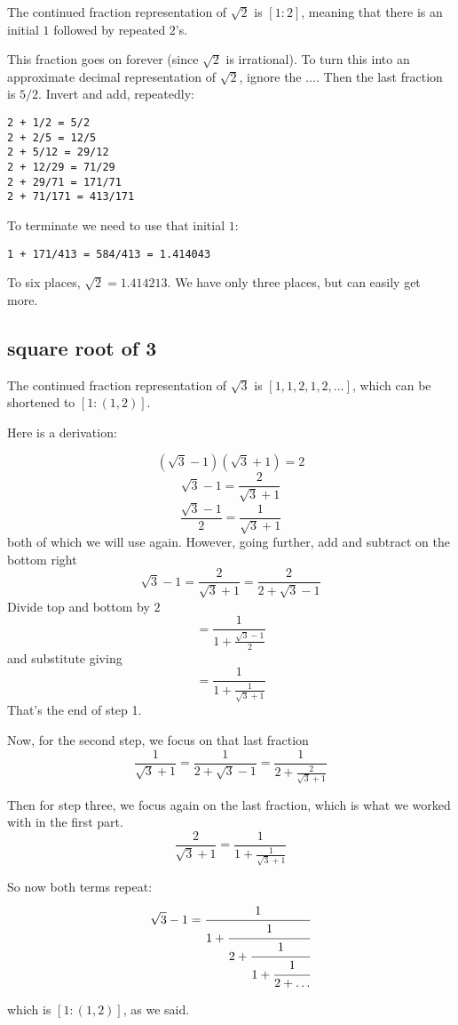 \documentclass[11pt, oneside]{article}
\begin{document}
The continued fraction representation of $\sqrt{2}$ is $[1:2]$, meaning that there is an initial $1$ followed by repeated $2$'s.

This fraction goes on forever (since $\sqrt{2}$ is irrational).  To turn this into an approximate decimal representation of $\sqrt{2}$, ignore the $\dots$.  Then the last fraction is $5/2$.  Invert and add, repeatedly:

\begin{verbatim}
2 + 1/2 = 5/2
2 + 2/5 = 12/5
2 + 5/12 = 29/12
2 + 12/29 = 71/29
2 + 29/71 = 171/71
2 + 71/171 = 413/171
\end{verbatim}

To terminate we need to use that initial $1$:
\begin{verbatim}
1 + 171/413 = 584/413 = 1.414043
\end{verbatim}

To six places, $\sqrt{2} = 1.414213$.  We have only three places, but can easily get more.

\subsection*{square root of 3}
The continued fraction representation of $\sqrt{3}$ is $[1,1,2,1,2, \dots]$, which can be shortened to $[1:(1,2)]$.  

Here is a derivation:

\[ (\sqrt{3} - 1)(\sqrt{3} + 1) = 2 \]
\[ \sqrt{3} - 1 = \frac{2}{\sqrt{3} + 1}   \]
\[ \frac{\sqrt{3} - 1}{2} = \frac{1}{\sqrt{3} + 1} \]
both of which we will use again.  However, going further, add and subtract on the bottom right
\[ \sqrt{3} - 1 = \frac{2}{\sqrt{3} + 1}  = \frac{2}{2 + \sqrt{3} - 1} \]
Divide top and bottom by $2$
\[ = \frac{1}{1 + \frac{\sqrt{3} - 1}{2}} \]
and substitute giving
\[= \frac{1}{1 + \frac{1}{\sqrt{3} +1}} \]
That's the end of step 1.

Now, for the second step, we focus on that last fraction
\[ \frac{1}{\sqrt{3} +1} = \frac{1}{2 + \sqrt{3} -1} = \frac{1}{2 + \frac{2}{\sqrt{3} + 1}} \]

Then for step three, we focus again on the last fraction, which is what we worked with in the first part.
\[ \frac{2}{\sqrt{3} + 1} = \frac{1}{1 + \frac{1}{\sqrt{3} +1}} \]

So now both terms repeat:
\[ \sqrt{3} - 1 = \cfrac{1}{1+\cfrac{1}{2+\cfrac{1}{1 + \cfrac{1}{2 + \dots }}}}  \]

which is $[1:(1,2)]$, as we said.
\end{document}
